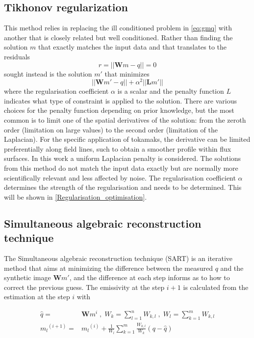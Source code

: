 \subsection{Tikhonov regularization}
This method relies in replacing the ill conditioned problem in \autoref{eq:gmq} with another that is closely related but well conditioned. Rather than finding the solution $m$ that exactly matches the input data and that translates to the residuals
\begin{equation}
r = ||\bm{W}m-q|| = 0
\label{eq:tikhonov1}
\end{equation}
sought instead is the solution $m'$ that minimizes
\begin{equation}
||\bm{W}m'-q|| + \alpha^2 ||\bm{L}m'||
\label{eq:tikhonov2}
\end{equation}
where the regularisation coefficient $\alpha$ is a scalar and the penalty function $L$ indicates what type of constraint is applied to the solution. There are various choices for the penalty function depending on prior knowledge, but the most common is to limit one of the spatial derivatives of the solution: from the zeroth order (limitation on large values) to the second order (limitation of the Laplacian). For the specific application of tokamaks, the derivative can be limited preferentially along field lines, such to obtain a smoother profile within flux surfaces.\cite{Schou2015} In this work a uniform Laplacian penalty is considered. The solutions from this method do not match the input data exactly but are normally more scientifically relevant and less affected by noise. The regularisation coefficient $\alpha$ determines the strength of the regularisation and needs to be determined. This will be shown in \autoref{Regularisation_optimisation}.
\subsection{Simultaneous algebraic reconstruction technique}
The Simultaneous algebraic reconstruction technique (SART) is an iterative method that aims at minimizing the difference between the measured $q$ and the synthetic image $\bm{W}m'$, and the difference at each step informs as to how to correct the previous guess. The emissivity at the step $i+1$ is calculated from the estimation at the step $i$ with \cite{Carr2018,Andersen1984}

\begin{equation}
\begin{aligned}
\hat{q} =& \bm{W} m^i \; , \; W_{k} = {\sum_{l=1}^{n} W_{k,l}} \; , \; W_{l} = {\sum_{k=1}^{m} W_{k,l}}  \\ {m_{l}}^{(i+1)} =& {m_{l}}^{(i)} + \frac{1}{W_{l}} {\sum_{k=1}^{m} \frac{W_{k,l}}{W_{k}}(q-\hat{q})}
\label{eq:sart1}
\end{aligned}
\end{equation}

